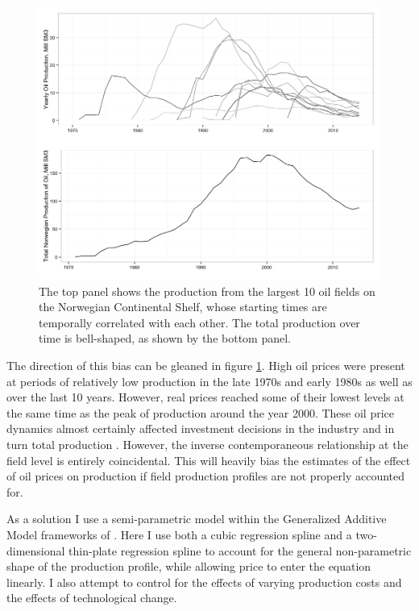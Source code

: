 \documentclass[12pt]{article}
\begin{document}
\begin{figure}
	\includegraphics[width=1\textwidth]{figures/oil_decline.png}
	\caption{The top panel shows the production from the largest 10 oil fields on the Norwegian Continental Shelf, whose starting times are temporally correlated with each other.  The total production over time is bell-shaped, as shown by the bottom panel.}
	\label{oil_decline}
\end{figure}

The direction of this bias can be gleaned in figure \ref{oil_decline}.  High oil prices were present at periods of relatively low production in the late 1970s and early 1980s as well as over the last 10 years. However, real prices reached some of their lowest levels at the same time as the peak of production around the year 2000. These oil price dynamics almost certainly affected investment decisions in the industry and in turn total production \citep{osmundsen_is_2007,aune_financial_2010}. However, the inverse contemporaneous relationship at the field level is entirely coincidental. This will heavily bias the estimates of the effect of oil prices on production if field production profiles are not properly accounted for. 

As a solution I use a semi-parametric model within the Generalized Additive Model frameworks of \cite{hastie_generalized_1990}.  Here I use both a cubic regression spline and a two-dimensional thin-plate regression spline to account for the general non-parametric shape of the production profile, while allowing price to enter the equation linearly. I also attempt to control for the effects of varying production costs and the effects of technological change.
\end{document}
